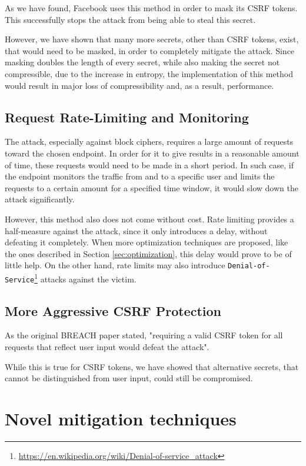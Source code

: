 As we have found, Facebook uses this method in order to mask its CSRF tokens.
This successfully stops the attack from being able to steal this secret.

However, we have shown that many more secrets, other than CSRF tokens, exist,
that would need to be masked, in order to completely mitigate the attack. Since
masking doubles the length of every secret, while also making the secret not
compressible, due to the increase in entropy, the implementation of this method
would result in major loss of compressibility and, as a result, performance.

\subsection{Request Rate-Limiting and Monitoring}

The attack, especially against block ciphers, requires a large amount of
requests toward the chosen endpoint. In order for it to give results in a
reasonable amount of time, these requests would need to be made in a short
period. In such case, if the endpoint monitors the traffic from and to a
specific user and limits the requests to a certain amount for a specified time
window, it would slow down the attack significantly.

However, this method also does not come without cost. Rate limiting provides a
half-measure against the attack, since it only introduces a delay, without
defeating it completely. When more optimization techniques are proposed, like
the ones described in Section \ref{sec:optimization}, this delay would prove to
be of little help. On the other hand, rate limits may also introduce
\texttt{Denial-of-Service}\footnote{\url{https://en.wikipedia.org/wiki/Denial-of-service_attack}}
attacks against the victim.

\subsection{More Aggressive CSRF Protection}

As the original BREACH paper stated, "requiring a valid CSRF token for all
requests that reflect user input would defeat the attack".

While this is true for CSRF tokens, we have showed that alternative secrets,
that cannot be distinguished from user input, could still be compromised.

\section{Novel mitigation techniques}\label{sec:novel_mitigation}

